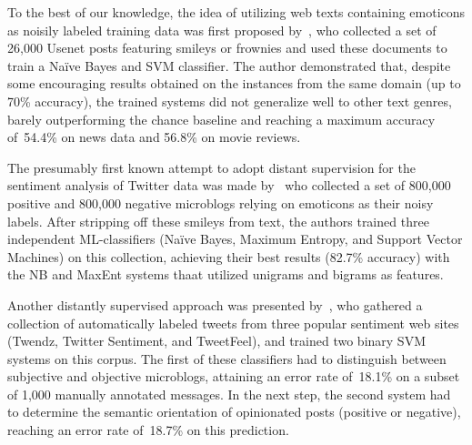 


\todo[inline]{}

To the best of our knowledge, the idea of utilizing web texts
containing emoticons as noisily labeled training data was first
proposed by~\citet{Read:05}, who collected a set of 26,000 Usenet
posts featuring smileys or frownies and used these documents to train
a Na{\"i}ve Bayes and SVM classifier.  The author demonstrated that,
despite some encouraging results obtained on the instances from the
same domain (up to 70\% accuracy), the trained systems did not
generalize well to other text genres, barely outperforming the chance
baseline and reaching a maximum accuracy of~54.4\% on news data and
56.8\% on movie reviews.

The presumably first known attempt to adopt distant supervision for
the sentiment analysis of Twitter data was made by~\citet{Go:09} who
collected a set of 800,000 positive and 800,000 negative microblogs
relying on emoticons as their noisy labels.  After stripping off these
smileys from text, the authors trained three independent
ML-classifiers (Na{\"i}ve Bayes, Maximum Entropy, and Support Vector
Machines) on this collection, achieving their best results (82.7\%
accuracy) with the NB and MaxEnt systems thaat utilized unigrams and
bigrams as features.

Another distantly supervised approach was presented
by~\citet{Barbosa:10}, who gathered a collection of automatically
labeled tweets from three popular sentiment web sites (Twendz, Twitter
Sentiment, and TweetFeel), and trained two binary SVM systems on this
corpus.  The first of these classifiers had to distinguish between
subjective and objective microblogs, attaining an error rate of~18.1\%
on a subset of 1,000 manually annotated messages.  In the next step,
the second system had to determine the semantic orientation of
opinionated posts (positive or negative), reaching an error rate
of~18.7\% on this prediction.

